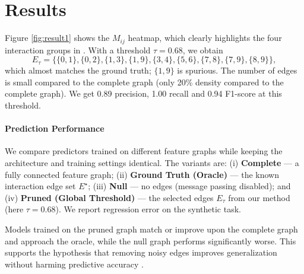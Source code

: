 \documentclass[10pt,a4paper]{article}
\begin{document}
\section{Results}

Figure \ref{fig:result1} shows the $M_{ij}$ heatmap, which clearly highlights the four interaction groups in .
With a threshold $\tau{=}0.68$, we obtain
\[
E_\tau = \{\{0,1\}, \{0,2\}, \{1,3\}, \{1,9\}, \{3,4\}, \{5,6\}, \{7,8\}, \{7,9\}, \{8,9\}\},
\]
which almost matches the ground truth; $\{1,9\}$ is spurious. The number of edges is small compared to the complete graph (only 20\% density compared to the complete graph). We get 0.89 precision, 1.00 recall and 0.94 F1-score at this threshold.

\paragraph{Prediction Performance}
We compare predictors trained on different feature graphs while keeping the architecture and training settings identical. The variants are: (i) \textbf{Complete} — a fully connected feature graph; (ii) \textbf{Ground Truth (Oracle)} — the known interaction edge set $E^\star$; (iii) \textbf{Null} — no edges (message passing disabled); and (iv) \textbf{Pruned (Global Threshold)} — the selected edges $E_\tau$ from our method (here $\tau{=}0.68$). We report regression error on the synthetic task.

Models trained on the pruned graph match or improve upon the complete graph and approach the oracle, while the null graph performs significantly worse. This supports the hypothesis that removing noisy edges improves generalization without harming predictive accuracy \cite{Yamchote2025FromFT}.
\end{document}
